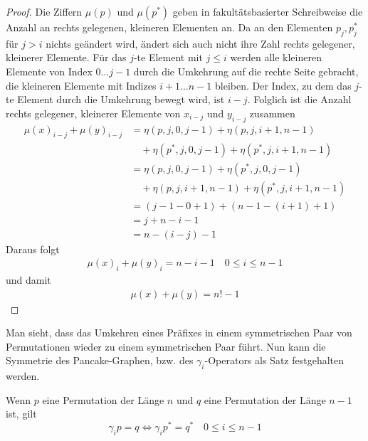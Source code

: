 \documentclass[a4paper, 10pt, ngerman]{article}
\begin{document}
\begin{proof}
    Die Ziffern $\mu(p)$ und $\mu(p^*)$ geben in fakultätsbasierter Schreibweise die Anzahl an rechts gelegenen, kleineren Elementen an. Da an den Elementen $p_j, p^*_j$ für $j > i$ nichts geändert wird, ändert sich auch nicht ihre Zahl rechts gelegener, kleinerer Elemente. Für das $j$-te Element mit $j \le i$ werden alle kleineren Elemente von Index $0 \dots j - 1$ durch die Umkehrung auf die rechte Seite gebracht, die kleineren Elemente mit Indizes $i + 1 \dots n - 1$ bleiben. Der Index, zu dem das $j$-te Element durch die Umkehrung bewegt wird, ist $i - j$. Folglich ist die Anzahl rechts gelegener, kleinerer Elemente von $x_{i - j}$ und $y_{i - j}$ zusammen
    \begin{align*}
        \mu(x)_{i - j} + \mu(y)_{i - j}
         & =  \eta(p, j, 0, j - 1) + \eta(p, j, i + 1, n - 1)            \\
         & \quad + \eta(p^*, j, 0, j - 1) + \eta(p^*, j, i + 1, n - 1)   \\
         & =  \eta(p, j, 0, j - 1) + \eta(p^*, j, 0, j - 1)              \\
         & \quad + \eta(p, j, i + 1, n - 1) + \eta(p^*, j, i + 1, n - 1) \\
         & =  (j - 1 - 0 + 1) + (n - 1 - (i + 1) + 1)                    \\
         & =  j + n - i - 1                                              \\
         & =  n - (i - j) - 1
    \end{align*}
    Daraus folgt
    \begin{align*}
        \mu(x)_i + \mu(y)_i = n - i - 1 \quad 0 \le i \le n - 1
    \end{align*}
    und damit
    \begin{align*}
        \mu(x) + \mu(y) = n! - 1
    \end{align*}
\end{proof}

Man sieht, dass das Umkehren eines Präfixes in einem symmetrischen Paar von Permutationen wieder zu einem symmetrischen Paar führt. Nun kann die Symmetrie des Pancake-Graphen, bzw. des $\gamma_i$-Operators als Satz festgehalten werden.

\begin{theorem}
    Wenn $p$ eine Permutation der Länge $n$ und $q$ eine Permutation der Länge $n - 1$ ist, gilt
    $$
        \gamma_i p = q \Longleftrightarrow \gamma_i p^* = q^* \quad 0 \le i \le n - 1
    $$
\end{theorem}
\end{document}
